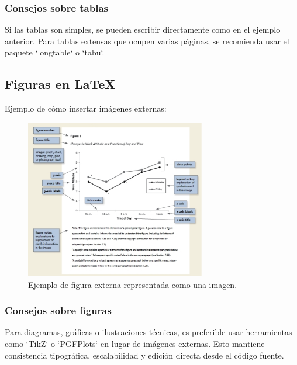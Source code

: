   \subsubsection{Consejos sobre tablas}
  Si las tablas son simples, se pueden escribir directamente como en el ejemplo anterior.  
  Para tablas extensas que ocupen varias páginas, se recomienda usar el paquete `longtable` o `tabu`.
 
  
  \subsection{Figuras en \LaTeX}
  
  Ejemplo de cómo insertar imágenes externas:
  
  \begin{figure}[H]
      \centering
      \includegraphics[width=0.7\textwidth]{images/figura.png}
      \caption{Ejemplo de figura externa representada como una imagen.}
      \label{fig:ejemplo_figura}
  \end{figure}
  
  \subsubsection{Consejos sobre figuras}
  Para diagramas, gráficas o ilustraciones técnicas, es preferible usar herramientas como `TikZ` o `PGFPlots` en lugar de imágenes externas.  
  Esto mantiene consistencia tipográfica, escalabilidad y edición directa desde el código fuente.
  
 
\clearpage 